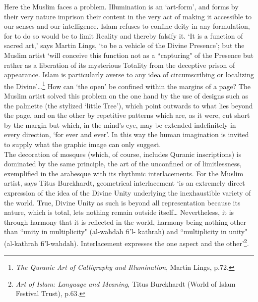 \documentclass[10pt, twoside]{book}
\begin{document}
Here the Muslim faces a problem. Illumination is an `art\hyp{}form', and forms by their very nature 
imprison their content in the very act of making it accessible to our senses and our intelligence. 
Islam refuses to confine deity in any formulation, for to do so would be to limit Reality and thereby 
falsify it. `It is a function of sacred art,' says Martin Lings, `to be a vehicle of the Divine 
Presence'; but the Muslim artist `will conceive this function not as a ``capturing" of the Presence 
but rather as a liberation of its mysterious Totality from the deceptive prison of appearance. Islam 
is particularly averse to any idea of circumscribing or localizing the Divine'\ldots{}\footnote{\emph{The Quranic Art of Calligraphy and Illumination}, Martin Lings, p.72.} How can `the 
open' be confined within the margins of a page? The Muslim artist solved this problem on the one hand 
by the use of designs such as the palmette (the stylized `little Tree'), which point outwards to what 
lies beyond the page, and on the other by repetitive patterns which are, as it were, cut short by the 
margin but which, in the mind's eye, may be extended indefinitely in every direction, `for ever and 
ever'. In this way the human imagination is invited to supply what the graphic image can only 
suggest. \\

The decoration of mosques (which, of course, includes Quranic inscriptions) is dominated by the same 
principle, the art of the unconfined or of limitlessness, exemplified in the arabesque with its 
rhythmic interlacements. For the Muslim artist, says Titus Burckhardt, geometrical interlacement `is 
an extremely direct expression of the idea of the Divine Unity underlying the inexhaustible variety 
of the world. True, Divine Unity as such is beyond all representation because its nature, which is 
total, lets nothing remain outside itself\ldots{} Nevertheless, it is through harmony that it is 
reflected in the world, harmony being nothing other than ``unity in multiplicity" (al\hyp{}wahdah fi'l\hyp{}
kathrah) and ``multiplicity in unity" (al\hyp{}kathrah fi'l\hyp{}wahdah). Interlacement expresses the one aspect 
and the other'\footnote{\emph{Art of Islam: Language and Meaning}, Titus Burckhardt (World of Islam Festival Trust), p.63.}. \\
\end{document}
